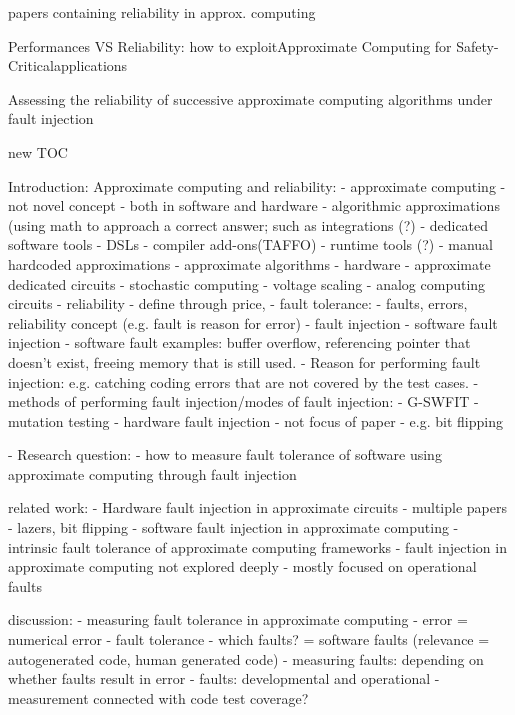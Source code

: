 papers containing reliability in approx. computing


Performances VS Reliability: how to exploitApproximate Computing for Safety-Criticalapplications

Assessing the reliability of successive approximate computing algorithms under fault injection


new TOC 

Introduction:
Approximate computing and reliability:
- approximate computing
    - not novel concept
    - both in software and hardware
    - algorithmic approximations (using math to approach a correct answer; such as integrations (?)
    - dedicated software tools 
        - DSLs 
        - compiler add-ons(TAFFO)
        - runtime tools (?)
        - manual hardcoded approximations
        - approximate algorithms
    - hardware
        - approximate dedicated circuits
        - stochastic computing
        - voltage scaling
        - analog computing circuits
- reliability
    - define through price, 
    - fault tolerance:
        - faults, errors, reliability concept (e.g. fault is reason for error)
    - fault injection
        - software fault injection
            - software fault examples: buffer overflow, referencing pointer that doesn't exist, freeing memory that is still used. 
            - Reason for performing fault injection: e.g. catching coding errors that are not covered by the test cases.    
            - methods of performing fault injection/modes of fault injection:
                - G-SWFIT
                - mutation testing
        - hardware fault injection
            - not focus of paper
            - e.g. bit flipping
            
- Research question:
    - how to measure fault tolerance of software using approximate computing through fault injection

related work: 
- Hardware fault injection in approximate circuits
    - multiple papers 
    - lazers, bit flipping
- software fault injection in approximate computing
    - intrinsic fault tolerance of approximate computing frameworks
    - fault injection in approximate computing not explored deeply
    - mostly focused on operational faults

discussion:
- measuring fault tolerance in approximate computing
    - error = numerical error
    - fault tolerance 
        - which faults? = software faults (relevance = autogenerated code, human generated code)
        - measuring faults: depending on whether faults result in error
        - faults: developmental and operational
        - measurement connected with code test coverage?

